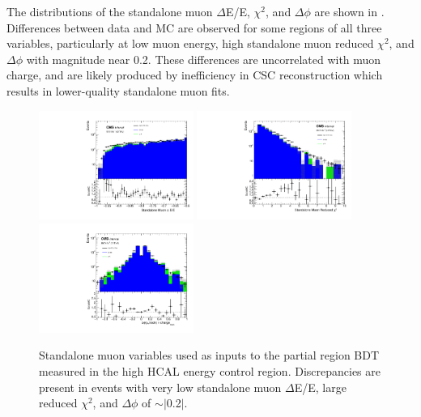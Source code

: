 The distributions of the standalone muon $\Delta$E/E, $\chi^{2}$, and $\Delta\phi$ are shown in . 
Differences between data and MC are observed for some regions of all three variables, particularly at low muon energy, high standalone muon reduced $\chi^{2}$, and $\Delta\phi$ with magnitude near 0.2. 
These differences are uncorrelated with muon charge, and are likely produced by inefficiency in CSC reconstruction which results in lower-quality standalone muon fits.

\begin{figure}[htbp]
	\centering
	\includegraphics[width=0.45\textwidth]{figures/standaloneMuonValidation.pdf}
	\hspace{0.01\textwidth}
	\includegraphics[width=0.45\textwidth]{figures/standaloneMuonChiValidation.pdf}
	\vspace{0.01\textwidth}
	\includegraphics[width=0.45\textwidth]{figures/standaloneMuonPhiValidation.pdf}
        \caption[Standalone Muon Validation]{Standalone muon variables used as inputs to the partial region BDT measured in the high HCAL energy control region. Discrepancies are present in events with very low standalone muon $\Delta$E/E, large reduced $\chi^{2}$, and $\Delta\phi$ of $\sim|$0.2$|$.}
        \label{fig:BDTstavalid}
\end{figure}

